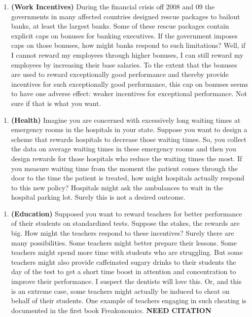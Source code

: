 \documentclass[
]{book}
\providecommand{\tightlist}{%
  \setlength{\itemsep}{0pt}\setlength{\parskip}{0pt}}
\begin{document}
\begin{enumerate}
\def\labelenumi{\arabic{enumi}.}
\setcounter{enumi}{2}
\tightlist
\item
  \textbf{(Work Incentives)} During the financial crisis off 2008 and 09 the governments in many affected countries designed rescue packages to bailout banks, at least the largest banks. Some of these rescue packages contain explicit caps on bonuses for banking executives. If the government imposes caps on those bonuses, how might banks respond to such limitations? Well, if I cannot reward my employees through higher bonuses, I can still reward my employees by increasing their base salaries. To the extent that the bonuses are used to reward exceptionally good performance and thereby provide incentives for such exceptionally good performance, this cap on bonuses seems to have one adverse effect: weaker incentives for exceptional performance. Not sure if that is what you want.
\end{enumerate}

\begin{enumerate}
\def\labelenumi{\arabic{enumi}.}
\setcounter{enumi}{3}
\tightlist
\item
  \textbf{(Health)} Imagine you are concerned with excessively long waiting times at emergency rooms in the hospitals in your state. Suppose you want to design a scheme that rewards hospitals to decrease those waiting times. So, you collect the data on average waiting times in these emergency rooms and then you design rewards for those hospitals who reduce the waiting times the most. If you measure waiting time from the moment the patient comes through the door to the time the patient is treated, how might hospitals actually respond to this new policy?
  Hospitals might ask the ambulances to wait in the hospital parking lot. Surely this is not a desired outcome.
\end{enumerate}

\begin{enumerate}
\def\labelenumi{\arabic{enumi}.}
\setcounter{enumi}{4}
\tightlist
\item
  \textbf{(Education)} Supposed you want to reward teachers for better performance of their students on standardized tests. Suppose the stakes, the rewards are big. How might the teachers respond to these incentives? Surely there are many possibilities.
  Some teachers might better prepare their lessons.
  Some teachers might spend more time with students who are struggling.
  But some teachers might also provide caffeinated sugary drinks to their students the day of the test to get a short time boost in attention and concentration to improve their performance. I suspect the dentists will love this.
  Or, and this is an extreme case, some teachers might actually be induced to cheat on behalf of their students. One example of teachers engaging in such cheating is documented in the first book Freakonomics. \textbf{NEED CITATION}
\end{enumerate}
\end{document}
